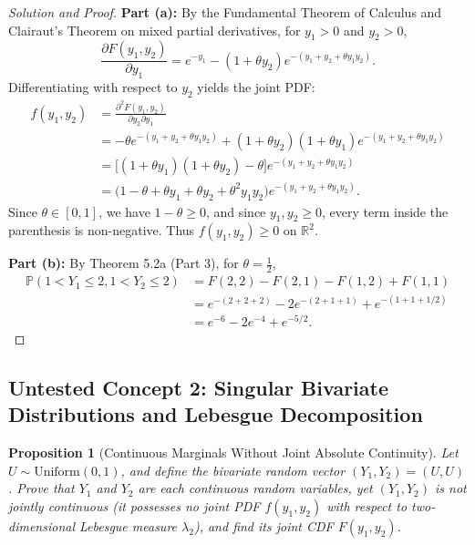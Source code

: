 \documentclass[11pt, letterpaper]{article}
\newtheorem{proposition}[theorem]{Proposition}
\theoremstyle{definition}
\theoremstyle{remark}
\begin{document}
\begin{proof}[Solution and Proof]
\textbf{Part (a):} By the Fundamental Theorem of Calculus and Clairaut's Theorem on mixed partial derivatives, for $y_1 > 0$ and $y_2 > 0$,
\[
    \frac{\partial F(y_1, y_2)}{\partial y_1} = e^{-y_1} - (1 + \theta y_2) e^{-(y_1 + y_2 + \theta y_1 y_2)}.
\]
Differentiating with respect to $y_2$ yields the joint PDF:
\begin{align*}
    f(y_1, y_2) &= \frac{\partial^2 F(y_1, y_2)}{\partial y_2 \partial y_1} \\
    &= -\theta e^{-(y_1 + y_2 + \theta y_1 y_2)} + (1 + \theta y_2)(1 + \theta y_1) e^{-(y_1 + y_2 + \theta y_1 y_2)} \\
    &= \bigl[ (1 + \theta y_1)(1 + \theta y_2) - \theta \bigr] e^{-(y_1 + y_2 + \theta y_1 y_2)} \\
    &= \bigl( 1 - \theta + \theta y_1 + \theta y_2 + \theta^2 y_1 y_2 \bigr) e^{-(y_1 + y_2 + \theta y_1 y_2)}.
\end{align*}
Since $\theta \in [0, 1]$, we have $1 - \theta \ge 0$, and since $y_1, y_2 \ge 0$, every term inside the parenthesis is non-negative. Thus $f(y_1, y_2) \ge 0$ on $\mathbb{R}^2$.

\textbf{Part (b):} By Theorem 5.2a (Part 3), for $\theta = \frac{1}{2}$,
\begin{align*}
    \mathbb{P}(1 < Y_1 \le 2, 1 < Y_2 \le 2) &= F(2, 2) - F(2, 1) - F(1, 2) + F(1, 1) \\
    &= e^{-(2 + 2 + 2)} - 2 e^{-(2 + 1 + 1)} + e^{-(1 + 1 + 1/2)} \\
    &= e^{-6} - 2e^{-4} + e^{-5/2}.
\end{align*}
\end{proof}

\subsection{Untested Concept 2: Singular Bivariate Distributions and Lebesgue Decomposition}

\begin{proposition}[Continuous Marginals Without Joint Absolute Continuity]
Let $U \sim \text{Uniform}(0, 1)$, and define the bivariate random vector $(Y_1, Y_2) = (U, U)$. Prove that $Y_1$ and $Y_2$ are each continuous random variables, yet $(Y_1, Y_2)$ is \emph{not} jointly continuous (it possesses no joint PDF $f(y_1, y_2)$ with respect to two-dimensional Lebesgue measure $\lambda_2$), and find its joint CDF $F(y_1, y_2)$.
\end{proposition}
\end{document}
